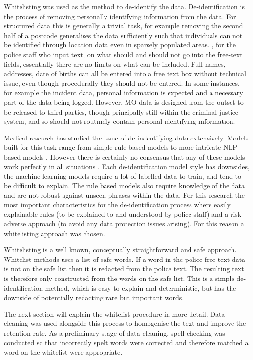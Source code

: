 Whitelisting was used as the method to de-identify the data. De-identification is the process of removing personally identifying information from the data. For structured data this is generally a trivial task, for example removing the second half of a postcode generalises the data sufficiently such that individuals can not be identified through location data even in sparsely populated areas. , for the police staff who input text, on what should and should not go into the free-text fields, essentially there are no limits on what can be included.  Full names, addresses, date of births can all be entered into a free text box without technical issue, even though procedurally they should not be entered. In some instances, for example the incident data, personal information is expected and a necessary part of the data being logged. However, MO data is designed from the outset to be released to third parties, though principally still within the criminal justice system, and so should not routinely contain personal identifying information.

Medical research has studied the issue of de-indentifying data extensively. Models built for this task range from simple rule based models to more intricate NLP based models \parencite{meystre2010automatic}. However there is certainly no consensus that any of these models work perfectly in all situations \parencite{narayanan2014no}. Each de-identification model style has downsides, the machine learning models require a lot of labelled data to train, and tend to be difficult to explain. The rule based models also require knowledge of the data and are not robust against unseen phrases within the data. For this research the most important characteristics for the de-identification process where easily explainable rules (to be explained to and understood by police staff) and a risk adverse approach (to avoid any data protection issues arising). For this reason a whitelisting approach was chosen.

Whitelisting is a well known, conceptually straightforward and safe approach. Whitelist methods uses a list of safe words. If a word in the police free text data is not on the safe list then it is redacted from the police text. The resulting text is therefore only constructed from the words on the safe list. This is a simple de-identification method, which is easy to explain and deterministic, but has the downside of potentially redacting rare but important words. 

The next section will explain the whitelist procedure in more detail. Data cleaning was used alongside this process to homogenise the text and improve the retention rate. As a preliminary stage of data cleaning, spell-checking was conducted so that incorrectly spelt words were corrected and therefore matched a word on the whitelist were appropriate. 

